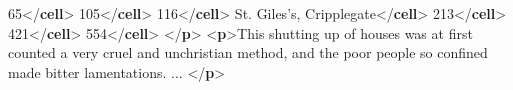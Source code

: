 \documentclass[11pt,twoside]{article}\makeatletter
\begin{document}
\begin{shaded}
\hspace*{1em}\hspace*{1em}65{</\textbf{cell}>}\mbox{}\newline 
\hspace*{1em}\hspace*{1em}105{</\textbf{cell}>}\mbox{}\newline 
\hspace*{1em}\hspace*{1em}116{</\textbf{cell}>}\mbox{}\newline 
\hspace*{1em}\mbox{}\newline 
\hspace*{1em}\mbox{}\newline 
\hspace*{1em}\hspace*{1em}St. Giles's, Cripplegate{</\textbf{cell}>}\mbox{}\newline 
\hspace*{1em}\hspace*{1em}213{</\textbf{cell}>}\mbox{}\newline 
\hspace*{1em}\hspace*{1em}421{</\textbf{cell}>}\mbox{}\newline 
\hspace*{1em}\hspace*{1em}554{</\textbf{cell}>}\mbox{}\newline 
\hspace*{1em}\mbox{}\newline 
{}\mbox{}\newline 
{</\textbf{p}>}\mbox{}\newline 
{<\textbf{p}>}This shutting up of houses was at first counted a very cruel\mbox{}\newline 
 and unchristian method, and the poor people so confined made\mbox{}\newline 
 bitter lamentations. ... {</\textbf{p}>}\end{shaded}\egroup\par 
\end{document}
